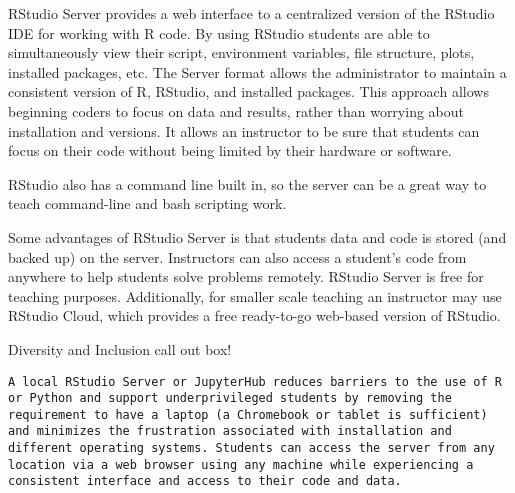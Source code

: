 RStudio Server provides a web interface to a centralized version of the RStudio IDE for working with R code. By using RStudio students are able to simultaneously view their script, environment variables, file structure, plots, installed packages, etc. The Server format allows the administrator to maintain a consistent version of R, RStudio, and installed packages. This approach allows beginning coders to focus on data and results, rather than worrying about installation and versions. It allows an instructor to be sure that students can focus on their code without being limited by their hardware or software.
 

RStudio also has a command line built in, so the server can be a great way to teach command-line and bash scripting work.

Some advantages of RStudio Server is that students data and code is stored (and backed up) on the server. 
Instructors can also access a student's code from anywhere to help students solve problems remotely.
RStudio Server is free for teaching purposes.
Additionally, for smaller scale teaching an instructor may use RStudio Cloud, which provides a free ready-to-go web-based version of RStudio.

{\begin{framed}
Diversity and Inclusion call out box! 
\begin{snugshade*}
\begin{lstlisting}
A local RStudio Server or JupyterHub reduces barriers to the use of R or Python and support underprivileged students by removing the requirement to have a laptop (a Chromebook or tablet is sufficient) and minimizes the frustration associated with installation and different operating systems. Students can access the server from any location via a web browser using any machine while experiencing a consistent interface and access to their code and data. 
\end{lstlisting}
\end{snugshade*}
\end{framed}}

